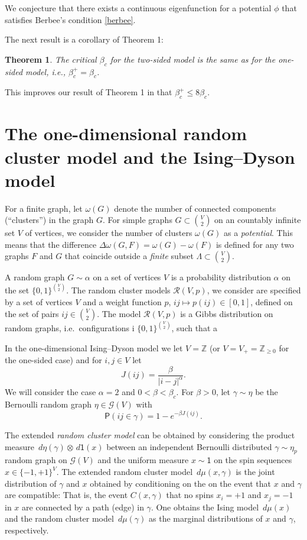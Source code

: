 \documentclass[11pt, a4paper]{amsart}
\newtheorem{thm}{Theorem}
\theoremstyle{definition}
\theoremstyle{remark}
\renewcommand{\d}{\,d}
\providecommand{\ZZ}{\mathbb{Z}}
\providecommand{\mscr}{\mathscr}
\renewcommand{\P}{\mathsf{P}}
\providecommand{\ett}{\mathsf{1}}
\providecommand{\g}{\gamma}
\providecommand{\w}{\omega}
\begin{document}
We conjecture that there exists a continuous eigenfunction for a potential
$\phi$ that satisfies Berbee's condition \eqref{berbee}.

The next result is a corollary of Theorem 1:

\begin{thm}
  The critical $\beta_c$ for the two-sided model is the same as for the
  one-sided model, i.e., $\beta_c^+=\beta_c$.
\end{thm}

This improves our result of Theorem 1 in \cite{johob4} that
$\beta_c^+\leq 8\beta_c$.
\section{The one-dimensional random cluster model and the Ising--Dyson model}

For a finite graph, let $\w(G)$ denote the number of connected components
(``clusters'') in the graph $G$. For simple graphs $G\subset \binom V2$ on an
countably infinite set $V$ of vertices, we consider the number of clusters
$\w(G)$ as a \emph{potential}. This means that the difference
$\Delta\w(G,F) = \w(G)-\w(F)$ is defined for any two graphs $F$ and $G$ that
coincide outside a \emph{finite} subset $\Lambda\subset \binom V2$.

A random graph $G\sim\alpha$ on a set of vertices $V$ is a probability
distribution $\alpha$ on the set $\{0,1\}^{\binom V2}$. The random cluster
models $\mscr R(V,p)$, we consider are specified by a set of vertices $V$ and a
weight function $p$, $ij\mapsto p(ij)\in[0,1]$, defined on the set of pairs
$ij\in \binom V2$. The model $\mscr R(V,p)$ is a Gibbs distribution on random
graphs, i.e.\ configurations i $\{0,1\}^{\binom V2}$, such that a

In the one-dimensional Ising--Dyson model we let $V=\ZZ$ (or $V=V_+=\ZZ_{\ge0}$
for the one-sided case) and for $i,j\in V$ let
\begin{equation}\label{eq:Jdef}
  J({ij}) = \frac \beta{|i-j|^\alpha}.
\end{equation}
We will consider the case $\alpha=2$ and $0<\beta <\beta_c$. For $\beta>0$, let
\(\g\sim \eta \) be the Bernoulli random graph $\eta \in \mscr G(V)$ with
$$
\P(ij \in \g)=1-e^{-\beta J({ij})}.
$$

The extended \emph{random cluster model} can be obtained by considering the
product measure $\d\eta(\g) \otimes \d\ett(x)$ between an independent Bernoulli
distributed $\g\sim\eta_p$ random graph on $\mscr G(V)$ and the uniform measure
$x\sim\ett$ on the spin sequences $x\in\{-1,+1\}^{V}$. The extended random
cluster model $\d\mu(x,\g)$ is the joint distribution of $\g$ and $x$ obtained
by conditioning on the on the event that $x$ and $\g$ are compatible: That is,
the event $C(x,\g)$ that no spins $x_i=+1$ and $x_j=-1$ in $x$ are connected by
a path (edge) in $\g$. One obtains the Ising model $\d\mu(x)$ and the random
cluster model $\d\mu(\g)$ as the marginal distributions of $x$ and $\g$,
respectively.
\end{document}
